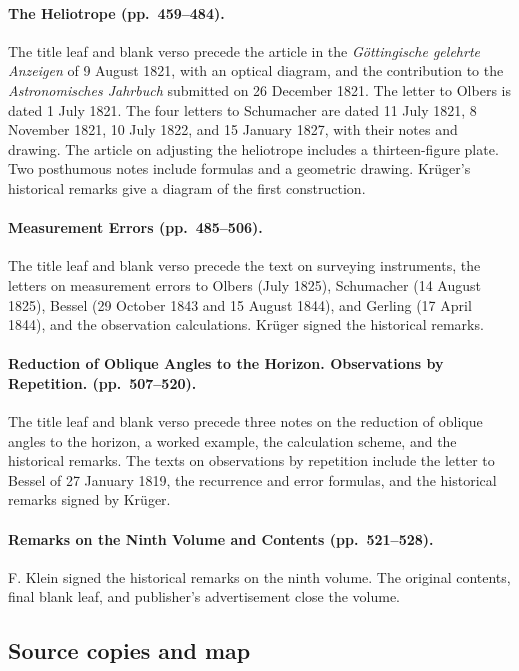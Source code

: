\paragraph{The Heliotrope (pp.~459--484).}
The title leaf and blank verso precede the article in the \textit{Göttingische gelehrte Anzeigen} of 9 August 1821, with an optical diagram, and the contribution to the \textit{Astronomisches Jahrbuch} submitted on 26 December 1821. The letter to Olbers is dated 1 July 1821. The four letters to Schumacher are dated 11 July 1821, 8 November 1821, 10 July 1822, and 15 January 1827, with their notes and drawing. The article on adjusting the heliotrope includes a thirteen-figure plate. Two posthumous notes include formulas and a geometric drawing. Krüger's historical remarks give a diagram of the first construction.

\paragraph{Measurement Errors (pp.~485--506).}
The title leaf and blank verso precede the text on surveying instruments, the letters on measurement errors to Olbers (July 1825), Schumacher (14 August 1825), Bessel (29 October 1843 and 15 August 1844), and Gerling (17 April 1844), and the observation calculations. Krüger signed the historical remarks.

\paragraph{Reduction of Oblique Angles to the Horizon. Observations by Repetition. (pp.~507--520).}
The title leaf and blank verso precede three notes on the reduction of oblique angles to the horizon, a worked example, the calculation scheme, and the historical remarks. The texts on observations by repetition include the letter to Bessel of 27 January 1819, the recurrence and error formulas, and the historical remarks signed by Krüger.

\paragraph{Remarks on the Ninth Volume and Contents (pp.~521--528).}
F. Klein signed the historical remarks on the ninth volume. The original contents, final blank leaf, and publisher's advertisement close the volume.

\subsection*{Source copies and map}

